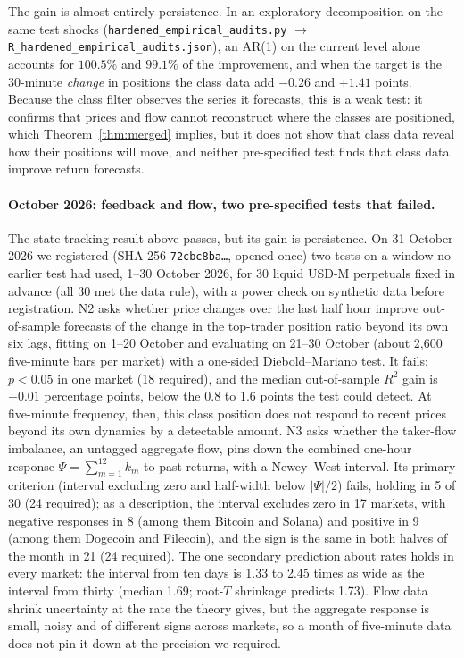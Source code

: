 \documentclass[12pt]{article}
\theoremstyle{definition}
\theoremstyle{remark}
\begin{document}
The gain is almost entirely persistence. In an exploratory decomposition on the same test shocks (\texttt{hardened\_empirical\_audits.py} $\to$ \texttt{R\_hardened\_empirical\_audits.json}), an AR(1) on the current level alone accounts for $100.5\%$ and $99.1\%$ of the improvement, and when the target is the 30-minute \emph{change} in positions the class data add $-0.26$ and $+1.41$ points. Because the class filter observes the series it forecasts, this is a weak test: it confirms that prices and flow cannot reconstruct where the classes are positioned, which Theorem~\ref{thm:merged} implies, but it does not show that class data reveal how their positions will move, and neither pre-specified test finds that class data improve return forecasts.

\paragraph{October 2026: feedback and flow, two pre-specified tests that failed.} The state-tracking result above passes, but its gain is persistence. On 31 October 2026 we registered (SHA-256 \texttt{72cbc8ba\ldots}, opened once) two tests on a window no earlier test had used, 1--30 October 2026, for 30 liquid USD-M perpetuals fixed in advance (all 30 met the data rule), with a power check on synthetic data before registration. N2 asks whether price changes over the last half hour improve out-of-sample forecasts of the change in the top-trader position ratio beyond its own six lags, fitting on 1--20 October and evaluating on 21--30 October (about 2,600 five-minute bars per market) with a one-sided Diebold--Mariano test. It fails: $p<0.05$ in one market (18 required), and the median out-of-sample $R^2$ gain is $-0.01$ percentage points, below the 0.8 to 1.6 points the test could detect. At five-minute frequency, then, this class position does not respond to recent prices beyond its own dynamics by a detectable amount. N3 asks whether the taker-flow imbalance, an untagged aggregate flow, pins down the combined one-hour response $\Psi=\sum_{m=1}^{12}k_m$ to past returns, with a Newey--West interval. Its primary criterion (interval excluding zero and half-width below $|\Psi|/2$) fails, holding in 5 of 30 (24 required); as a description, the interval excludes zero in 17 markets, with negative responses in 8 (among them Bitcoin and Solana) and positive in 9 (among them Dogecoin and Filecoin), and the sign is the same in both halves of the month in 21 (24 required). The one secondary prediction about rates holds in every market: the interval from ten days is 1.33 to 2.45 times as wide as the interval from thirty (median 1.69; root-$T$ shrinkage predicts 1.73). Flow data shrink uncertainty at the rate the theory gives, but the aggregate response is small, noisy and of different signs across markets, so a month of five-minute data does not pin it down at the precision we required.
\end{document}
